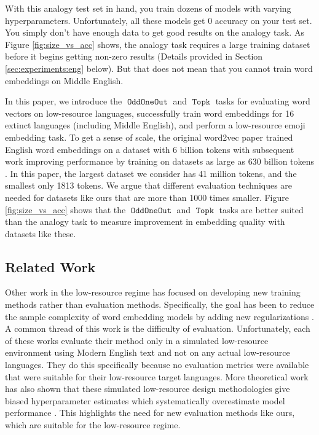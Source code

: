 \documentclass[11pt,a4paper]{article}
\DeclareMathOperator{\OddOneOut}{\texttt{OddOneOut}}
\DeclareMathOperator{\topk}{\texttt{Topk}}
\begin{document}
With this analogy test set in hand,
you train dozens of models with varying hyperparameters.
Unfortunately, all these models get 0 accuracy on your test set.
You simply don't have enough data to get good results on the analogy task.
As Figure \ref{fig:size_vs_acc} shows,
the analogy task requires a large training dataset before it begins getting non-zero results
(Details provided in Section \ref{sec:experiments:eng} below).
But that does not mean that you cannot train word embeddings on Middle English.

In this paper,
we introduce the $\OddOneOut$ and $\topk$ tasks for evaluating word vectors on low-resource languages, 
successfully train word embeddings for 16 extinct languages (including Middle English), 
and perform a low-resource emoji embedding task.
To get a sense of scale, the original word2vec paper trained English word embeddings on a dataset with 6 billion tokens \citep{mikolov2013efficient} with subsequent work improving performance by training on datasets as large as 630 billion tokens \citep{grave2018learning}. 
In this paper, the largest dataset we consider has 41 million tokens,
and the smallest only 1813 tokens.
We argue that different evaluation techniques are needed for datasets like ours that are more than 1000 times smaller.
Figure \ref{fig:size_vs_acc} shows that the $\OddOneOut$ and $\topk$ tasks are better suited than the analogy task to measure improvement in embedding quality with datasets like these.

\subsection{Related Work}
Other work in the low-resource regime has focused on developing new training methods rather than evaluation methods.
Specifically, the goal has been to reduce the sample complexity of word embedding models by adding new regularizations \cite{adams-etal-2017-cross,jiang2018learningword,gupta-etal-2019-improving,jungmaier-etal-2020-dirichlet}.
A common thread of this work is the difficulty of evaluation.
Unfortunately, each of these works evaluate their method only in a simulated low-resource environment using Modern English text and not on any actual low-resource languages.
They do this specifically because no evaluation metrics were available that were suitable for their low-resource target languages.
More theoretical work has also shown that these simulated low-resource design methodologies give biased hyperparameter estimates which systematically overestimate model performance \citep{kann-etal-2019-towards}.
This highlights the need for new evaluation methods like ours, which are suitable for the low-resource regime.
\end{document}

